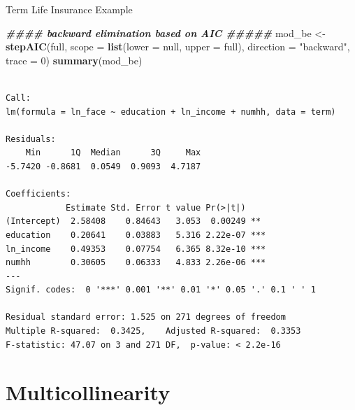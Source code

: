 \documentclass[
  ignorenonframetext,
]{beamer}
\newenvironment{Shaded}{\begin{snugshade}}{\end{snugshade}}
\newcommand{\AttributeTok}[1]{\textcolor[rgb]{0.13,0.29,0.53}{#1}}
\newcommand{\DecValTok}[1]{\textcolor[rgb]{0.00,0.00,0.81}{#1}}
\newcommand{\DocumentationTok}[1]{\textcolor[rgb]{0.56,0.35,0.01}{\textbf{\textit{#1}}}}
\newcommand{\FunctionTok}[1]{\textcolor[rgb]{0.13,0.29,0.53}{\textbf{#1}}}
\newcommand{\NormalTok}[1]{#1}
\newcommand{\OtherTok}[1]{\textcolor[rgb]{0.56,0.35,0.01}{#1}}
\newcommand{\StringTok}[1]{\textcolor[rgb]{0.31,0.60,0.02}{#1}}
\begin{document}
\begin{frame}[fragile]{Term Life Insurance Example}
\label{term-life-insurance-example-6}
\scriptsize

\begin{Shaded}
\begin{Highlighting}[]
\DocumentationTok{\#\#\#\# backward elimination based on AIC \#\#\#\#\#}
\NormalTok{mod\_be }\OtherTok{\textless{}{-}} \FunctionTok{stepAIC}\NormalTok{(full, }\AttributeTok{scope =} \FunctionTok{list}\NormalTok{(}\AttributeTok{lower =}\NormalTok{ null, }\AttributeTok{upper =}\NormalTok{ full), }
                 \AttributeTok{direction =} \StringTok{"backward"}\NormalTok{, }\AttributeTok{trace =} \DecValTok{0}\NormalTok{)}
\FunctionTok{summary}\NormalTok{(mod\_be)}
\end{Highlighting}
\end{Shaded}

\begin{verbatim}

Call:
lm(formula = ln_face ~ education + ln_income + numhh, data = term)

Residuals:
    Min      1Q  Median      3Q     Max 
-5.7420 -0.8681  0.0549  0.9093  4.7187 

Coefficients:
            Estimate Std. Error t value Pr(>|t|)    
(Intercept)  2.58408    0.84643   3.053  0.00249 ** 
education    0.20641    0.03883   5.316 2.22e-07 ***
ln_income    0.49353    0.07754   6.365 8.32e-10 ***
numhh        0.30605    0.06333   4.833 2.26e-06 ***
---
Signif. codes:  0 '***' 0.001 '**' 0.01 '*' 0.05 '.' 0.1 ' ' 1

Residual standard error: 1.525 on 271 degrees of freedom
Multiple R-squared:  0.3425,    Adjusted R-squared:  0.3353 
F-statistic: 47.07 on 3 and 271 DF,  p-value: < 2.2e-16
\end{verbatim}

\normalsize
\end{frame}

\section{Multicollinearity}\label{multicollinearity}
\end{document}
